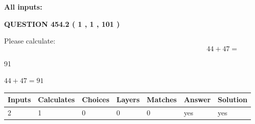 \documentclass[12pt]{article}
\begin{document}
   
   
   
\noindent{}
   
   
   
   
\noindent\vspace{0.1in}\hspace{-0.08in} {\textbf{\Large{All inputs: }}}
   
   
  
\vspace{0.2in}
  
{\textbf{\Large{QUESTION
454.2 
 ( 1 , 1 , 101 )
}}}
  
  
 
Please calculate:
\begin{equation}
44 +  %
47 = \nonumber
\end{equation}
 
 
 
\noindent{}
 
 

91
 
 
\noindent{}
 
 

 
 
 
\noindent{}
 
 

$ %
44 +  %
47=   %
91$
 
 
\noindent{}
 
 

 
   
   
   
   
\noindent\begin{tabular}{|l|l|l|l|l|l|l|}
 \hline
Inputs & Calculates & Choices & Layers & Matches & Answer & Solution \\ \hline
 2  & 
 1  & 
 0
  & 
 0  & 
 0  & 
  yes & 
  yes 
  \\ \hline
 \end{tabular}
   
   
   
   
\noindent{}
   
\end{document}

